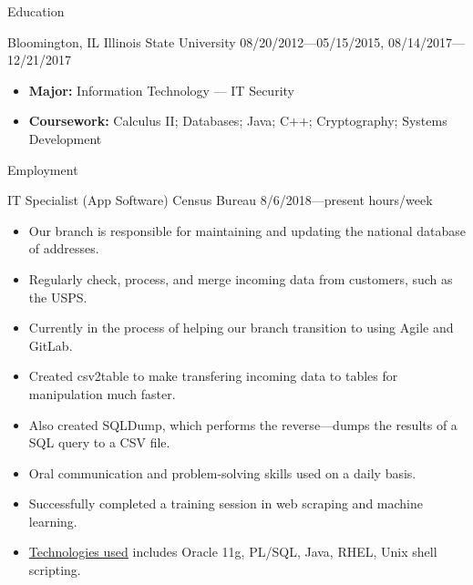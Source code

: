 \documentclass{mcdowellcv}
\begin{document}
  \makeheader

    \begin{cvsection}{Education}
        \begin{cvsubsection}
      {Bloomington, IL}
      {Illinois State University}
      {08/20/2012---05/15/2015, 08/14/2017---12/21/2017}
      \begin{itemize}
                \item \textbf{Major:} Information Technology --- IT Security
                \item \textbf{Coursework:} Calculus II; Databases; Java; C++; Cryptography;
Systems Development
              \end{itemize}
    \end{cvsubsection}
      \end{cvsection}
  
    \begin{cvsection}{Employment}
        \begin{cvsubsection}
      {IT Specialist (App Software)}
      {Census Bureau}
      {8/6/2018---present  hours/week}
            
      \begin{itemize}
                \item Our branch is responsible for maintaining and updating the national
database of addresses.
                \item Regularly check, process, and merge incoming data from customers, such
as the USPS.
                \item Currently in the process of helping our branch transition to using Agile
and GitLab.
                \item Created csv2table to make transfering incoming data to tables for
manipulation much faster.
                \item Also created SQLDump, which performs the reverse---dumps the results of
a SQL query to a CSV file.
                \item Oral communication and problem-solving skills used on a daily basis.
                \item Successfully completed a training session in web scraping and machine
learning.
                \item \underline{Technologies used} includes Oracle 11g, PL/SQL, Java, RHEL,
Unix shell scripting.
              \end{itemize}
          \end{cvsubsection}
      \end{cvsection}
    
\end{document}
